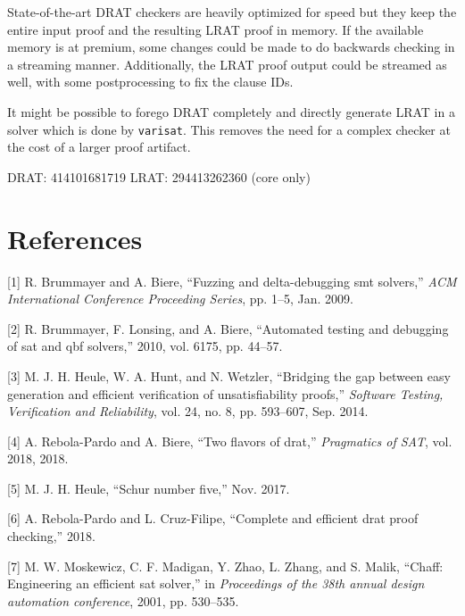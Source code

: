 \documentclass[
]{report}
\begin{document}
State-of-the-art DRAT checkers are heavily optimized for speed but they
keep the entire input proof and the resulting LRAT proof in memory. If
the available memory is at premium, some changes could be made to do
backwards checking in a streaming manner. Additionally, the LRAT proof
output could be streamed as well, with some postprocessing to fix the
clause IDs.

It might be possible to forego DRAT completely and directly generate
LRAT in a solver which is done by \texttt{varisat}. This removes the
need for a complex checker at the cost of a larger proof artifact.

 DRAT: 414101681719 LRAT: 294413262360 (core only) \fi

\hypertarget{references}{%
\chapter*{References}\label{references}}

\hypertarget{refs}{}
\leavevmode\hypertarget{ref-BrummayerBiere-SMT09}{}%
{[}1{]} R. Brummayer and A. Biere, ``Fuzzing and delta-debugging smt
solvers,'' \emph{ACM International Conference Proceeding Series}, pp.
1--5, Jan. 2009.

\leavevmode\hypertarget{ref-BrummayerLonsingBiere-SAT10}{}%
{[}2{]} R. Brummayer, F. Lonsing, and A. Biere, ``Automated testing and
debugging of sat and qbf solvers,'' 2010, vol. 6175, pp. 44--57.

\leavevmode\hypertarget{ref-Heule_2014}{}%
{[}3{]} M. J. H. Heule, W. A. Hunt, and N. Wetzler, ``Bridging the gap
between easy generation and efficient verification of unsatisfiability
proofs,'' \emph{Software Testing, Verification and Reliability}, vol.
24, no. 8, pp. 593--607, Sep. 2014.

\leavevmode\hypertarget{ref-rebola2018two}{}%
{[}4{]} A. Rebola-Pardo and A. Biere, ``Two flavors of drat,''
\emph{Pragmatics of SAT}, vol. 2018, 2018.

\leavevmode\hypertarget{ref-schur-5}{}%
{[}5{]} M. J. H. Heule, ``Schur number five,'' Nov. 2017.

\leavevmode\hypertarget{ref-RebolaCruz2018}{}%
{[}6{]} A. Rebola-Pardo and L. Cruz-Filipe, ``Complete and efficient
drat proof checking,'' 2018.

\leavevmode\hypertarget{ref-Moskewicz:2001:CEE:378239.379017}{}%
{[}7{]} M. W. Moskewicz, C. F. Madigan, Y. Zhao, L. Zhang, and S. Malik,
``Chaff: Engineering an efficient sat solver,'' in \emph{Proceedings of
the 38th annual design automation conference}, 2001, pp. 530--535.
\end{document}
